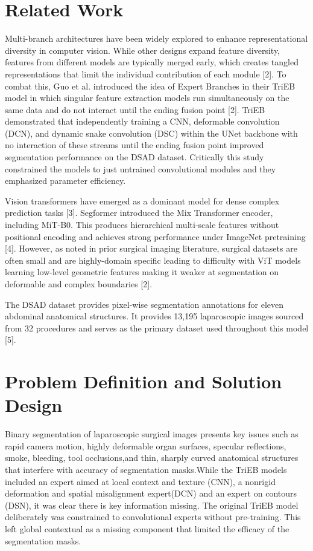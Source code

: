 \documentclass[twocolumn]{article}
\begin{document}
\section{Related Work}

Multi-branch architectures have been widely explored to enhance representational diversity in computer vision. While other designs expand feature diversity, features from different models are typically merged early, which creates tangled representations that limit the individual contribution of each module [2]. To combat this, Guo et al. introduced the idea of Expert Branches in their TriEB model in which singular feature extraction models run simultaneously on the same data and do not interact until the ending fusion point [2]. TriEB demonstrated that independently training a CNN, deformable convolution (DCN), and dynamic snake convolution (DSC) within the UNet backbone with no interaction of these streams until the ending fusion point improved segmentation performance on the DSAD dataset. Critically this study constrained the models to just untrained convolutional modules and they emphasized parameter efficiency. 

Vision transformers have emerged as a dominant model for dense complex prediction tasks [3]. Segformer introduced the Mix Transformer encoder, including MiT-B0. This produces hierarchical multi-scale features without positional encoding and achieves strong performance under ImageNet pretraining [4]. However, as noted in prior surgical imaging literature, surgical datasets are often small and are highly-domain specific leading to difficulty with ViT models learning low-level geometric features making it weaker at segmentation on deformable and complex boundaries [2].

The DSAD dataset provides pixel-wise segmentation annotations for eleven abdominal anatomical structures. It provides 13,195 laparoscopic images sourced from 32 procedures and serves as the primary dataset used throughout this model [5].

\section{Problem Definition and Solution Design}

Binary segmentation of laparoscopic surgical images presents key issues such as rapid camera motion, highly deformable organ surfaces, specular reflections, smoke, bleeding, tool occlusions,and thin, sharply curved anatomical structures that interfere with accuracy of segmentation masks.While the TriEB models included an expert aimed at local context and texture (CNN), a nonrigid deformation and spatial misalignment expert(DCN) and an expert on contours (DSN), it was clear there is key information missing. The original TriEB model deliberately was constrained to convolutional experts without pre-training. This left global contextual as a missing component that limited the efficacy of the segmentation masks. 
\end{document}
